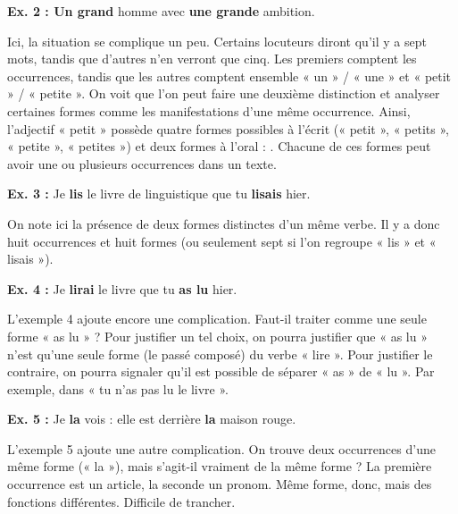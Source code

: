 \noindent\textbf{Ex. 2 : Un grand} homme avec \textbf{une grande} ambition.

Ici, la situation se complique un peu. Certains locuteurs diront qu’il y a sept mots, tandis que d’autres n’en verront que cinq. Les premiers comptent les occurrences, tandis que les autres comptent ensemble « un » / « une » et « petit » / « petite ». On voit que l’on peut faire une deuxième distinction et analyser certaines formes comme les manifestations d’une même occurrence. Ainsi, l’adjectif « petit » possède quatre formes possibles à l’écrit (« petit », « petits », « petite », « petites ») et deux formes à l’oral : \bipa{[p(ə)ti], [p(ə)tit]}. Chacune de ces formes peut avoir une ou plusieurs occurrences dans un texte.

\noindent\textbf{Ex. 3 :} Je \textbf{lis} le livre de linguistique que tu \textbf{lisais} hier.

On note ici la présence de deux formes distinctes d’un même verbe. Il y a donc huit occurrences et huit formes (ou seulement sept si l’on regroupe « lis » et « lisais »).

\noindent\textbf{Ex. 4 :} Je \textbf{lirai} le livre que tu \textbf{as lu} hier.

L’exemple 4 ajoute encore une complication. Faut-il traiter comme une seule forme « as lu » ? Pour justifier un tel choix, on pourra justifier que « as lu » n’est qu’une seule forme (le passé composé) du verbe « lire ». Pour justifier le contraire, on pourra signaler qu’il est possible de séparer « as » de « lu ». Par exemple, dans « tu n’as pas lu le livre ».

\noindent\textbf{Ex. 5 :} Je \textbf{la} vois : elle est derrière \textbf{la} maison rouge.

L’exemple 5 ajoute une autre complication. On trouve deux occurrences d’une même forme (« la »), mais s’agit-il vraiment de la même forme ? La première occurrence est un article, la seconde un pronom. Même forme, donc, mais des fonctions différentes. Difficile de trancher.

